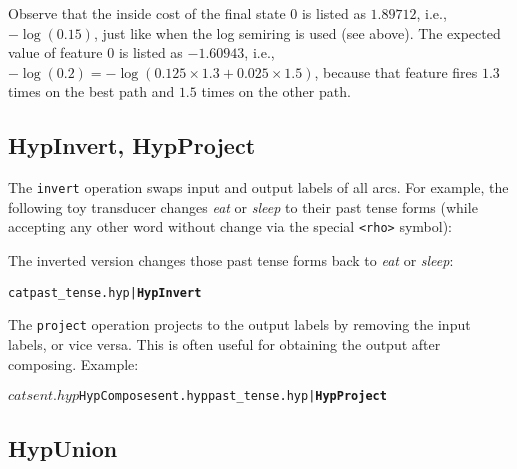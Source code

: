 \documentclass[12pt]{article}
\newcommand{\code}[1]{\texttt{#1}}
\begin{document}
Observe that the inside cost of the final state $0$ is listed as
$1.89712$, i.e., $-\log(0.15)$, just like when the log semiring is
used (see above). The expected value of feature $0$ is listed as
$-1.60943$, i.e., $-\log(0.2)=-\log(0.125 \times 1.3 + 0.025 \times
1.5)$, because that feature fires $1.3$ times on the best path and
$1.5$ times on the other path.

\subsection{HypInvert, HypProject}\label{sec:invert-project}

The \code{invert} operation swaps input and output labels of all arcs.
For example, the following toy transducer changes \textit{eat} or
\textit{sleep} to their past tense forms (while accepting any other
word without change via the special \code{<rho>} symbol):


\noindent The inverted version changes those past tense forms back to
\textit{eat} or \textit{sleep}:

\begin{mdframed}\footnotesize\begin{alltt}
  cat past_tense.hyp | \textbf{HypInvert}

\end{alltt}\end{mdframed}

The \code{project} operation projects to the output labels by removing
the input labels, or vice versa. This is often useful for obtaining
the output after composing. Example:

\begin{mdframed}\footnotesize\begin{alltt}
$ cat sent.hyp

$ HypCompose sent.hyp past_tense.hyp | \textbf{HypProject}

\end{alltt}\end{mdframed}

\subsection{HypUnion}
\end{document}
